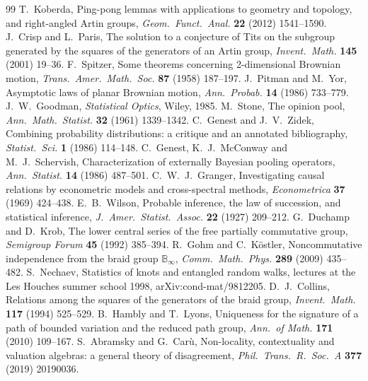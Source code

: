 \documentclass[11pt]{article}
\theoremstyle{definition}\newtheorem{definition}[theorem]{Definition}\newtheorem{remark}[theorem]{Remark}\newtheorem{example}[theorem]{Example}\newtheorem{problem}[theorem]{Open problem}\crefname{problem}{Problem}{Problems}
\begin{document}
\begin{thebibliography}{99}
 T.~Koberda, Ping-pong lemmas with applications to geometry and topology, and right-angled Artin groups, \emph{Geom.\ Funct.\ Anal.} \textbf{22} (2012) 1541--1590.
 J.~Crisp and L.~Paris, The solution to a conjecture of Tits on the subgroup generated by the squares of the generators of an Artin group, \emph{Invent.\ Math.} \textbf{145} (2001) 19--36.
 F.~Spitzer, Some theorems concerning 2-dimensional Brownian motion, \emph{Trans.\ Amer.\ Math.\ Soc.} \textbf{87} (1958) 187--197.
 J.~Pitman and M.~Yor, Asymptotic laws of planar Brownian motion, \emph{Ann.\ Probab.} \textbf{14} (1986) 733--779.
 J.~W.~Goodman, \emph{Statistical Optics}, Wiley, 1985.
 M.~Stone, The opinion pool, \emph{Ann.\ Math.\ Statist.} \textbf{32} (1961) 1339--1342.
 C.~Genest and J.~V.~Zidek, Combining probability distributions: a critique and an annotated bibliography, \emph{Statist.\ Sci.} \textbf{1} (1986) 114--148.
 C.~Genest, K.~J.~McConway and M.~J.~Schervish, Characterization of externally Bayesian pooling operators, \emph{Ann.\ Statist.} \textbf{14} (1986) 487--501.
 C.~W.~J.~Granger, Investigating causal relations by econometric models and cross-spectral methods, \emph{Econometrica} \textbf{37} (1969) 424--438.
 E.~B.~Wilson, Probable inference, the law of succession, and statistical inference, \emph{J.\ Amer.\ Statist.\ Assoc.} \textbf{22} (1927) 209--212.
 G.~Duchamp and D.~Krob, The lower central series of the free partially commutative group, \emph{Semigroup Forum} \textbf{45} (1992) 385--394.
 R.~Gohm and C.~K\"ostler, Noncommutative independence from the braid group $\mathbb B_\infty$, \emph{Comm.\ Math.\ Phys.} \textbf{289} (2009) 435--482.
 S.~Nechaev, Statistics of knots and entangled random walks, lectures at the Les Houches summer school 1998, arXiv:cond-mat/9812205.
 D.~J.~Collins, Relations among the squares of the generators of the braid group, \emph{Invent.\ Math.} \textbf{117} (1994) 525--529.
 B.~Hambly and T.~Lyons, Uniqueness for the signature of a path of bounded variation and the reduced path group, \emph{Ann.\ of Math.} \textbf{171} (2010) 109--167.
 S.~Abramsky and G.~Car\`u, Non-locality, contextuality and valuation algebras: a general theory of disagreement, \emph{Phil.\ Trans.\ R.\ Soc.\ A} \textbf{377} (2019) 20190036.

\end{thebibliography}
\end{document}
